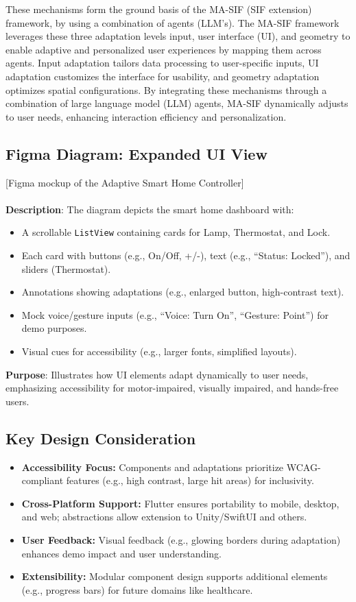 \documentclass[openany]{book}
\begin{document}
    These mechanisms form the ground basis of the MA-SIF (SIF extension) framework, by using a combination of agents (LLM's). The MA-SIF framework leverages these three adaptation levels input, user interface (UI), and geometry to enable adaptive and personalized user experiences by mapping them across agents. Input adaptation tailors data processing to user-specific inputs, UI adaptation customizes the interface for usability, and geometry adaptation optimizes spatial configurations. By integrating these mechanisms through a combination of large language model (LLM) agents, MA-SIF dynamically adjusts to user needs, enhancing interaction efficiency and personalization.
    \subsection{Figma Diagram: Expanded UI View}
    [Figma mockup of the Adaptive Smart Home Controller] \\\\
    \textbf{Description}: The diagram depicts the smart home dashboard with:
    \begin{itemize}
        \item A scrollable \verb|ListView| containing cards for Lamp, Thermostat, and Lock.
        \item Each card with buttons (e.g., On/Off, +/-), text (e.g., “Status: Locked”), and sliders (Thermostat).
        \item Annotations showing adaptations (e.g., enlarged button, high-contrast text).
        \item Mock voice/gesture inputs (e.g., “Voice: Turn On”, “Gesture: Point”) for demo purposes.
        \item Visual cues for accessibility (e.g., larger fonts, simplified layouts).
    \end{itemize}
    \textbf{Purpose}: Illustrates how UI elements adapt dynamically to user needs, emphasizing accessibility for motor-impaired, visually impaired, and hands-free users.
\subsection{Key Design Consideration}
\begin{itemize}
    \item \textbf{Accessibility Focus:} Components and adaptations prioritize WCAG-compliant features (e.g., high contrast, large hit areas) for inclusivity.
    \item \textbf{Cross-Platform Support:} Flutter ensures portability to mobile, desktop, and web; abstractions allow extension to Unity/SwiftUI and others.
    \item \textbf{User Feedback:} Visual feedback (e.g., glowing borders during adaptation) enhances demo impact and user understanding.
    \item \textbf{Extensibility:} Modular component design supports additional elements (e.g., progress bars) for future domains like healthcare.
\end{itemize}
    
\end{document}
